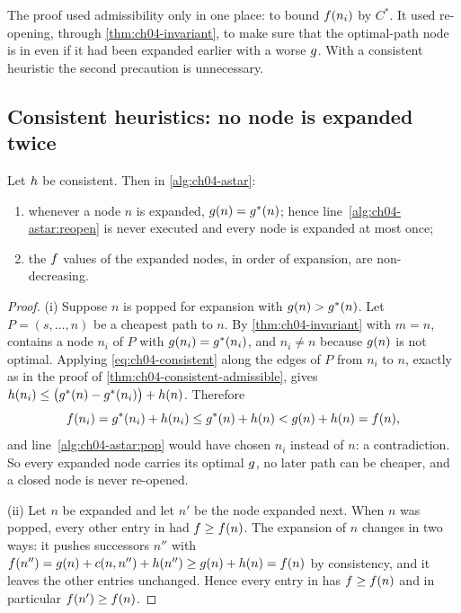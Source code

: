 The proof used admissibility only in one place: to bound $f(n_i)$ by
$C^*$. It used re-opening, through \cref{thm:ch04-invariant}, to make sure
that the optimal-path node is in \Open even if it had been expanded earlier
with a worse $g$. With a consistent heuristic the second precaution is
unnecessary.

\subsection{Consistent heuristics: no node is expanded twice}

\begin{theorem}
\label{thm:ch04-consistent}
Let $h$ be consistent. Then in \cref{alg:ch04-astar}:
\begin{enumerate}[label=(\roman*)]
  \item whenever a node $n$ is expanded, $g(n) = g^*(n)$; hence
        line~\ref{alg:ch04-astar:reopen} is never executed and every node is
        expanded at most once;
  \item the $f$ values of the expanded nodes, in order of expansion, are
        non-decreasing.
\end{enumerate}
\end{theorem}
\begin{proof}
(i) Suppose $n$ is popped for expansion with $g(n) > g^*(n)$. Let
$P = (s, \dots, n)$ be a cheapest path to $n$. By \cref{thm:ch04-invariant}
with $m = n$, \Open contains a node $n_i$ of $P$ with $g(n_i) =
g^*(n_i)$, and $n_i \ne n$ because $g(n)$ is not optimal. Applying
\cref{eq:ch04-consistent} along the edges of $P$ from $n_i$ to $n$, exactly as
in the proof of \cref{thm:ch04-consistent-admissible}, gives $h(n_i) \le
\bigl(g^*(n) - g^*(n_i)\bigr) + h(n)$. Therefore
\[
  f(n_i) = g^*(n_i) + h(n_i) \le g^*(n) + h(n)
             < g(n) + h(n) = f(n),
\]
and line~\ref{alg:ch04-astar:pop} would have chosen $n_i$ instead of $n$: a
contradiction. So every expanded node carries its optimal $g$, no later
path can be cheaper, and a closed node is never re-opened.

(ii) Let $n$ be expanded and let $n'$ be the node expanded next. When $n$ was
popped, every other entry in \Open had $f \ge f(n)$. The expansion of
$n$ changes \Open in two ways: it pushes successors $n''$ with
$f(n'') = g(n) + c(n, n'') + h(n'') \ge g(n) + h(n) =
f(n)$ by consistency, and it leaves the other entries unchanged. Hence
every entry in \Open has $f \ge f(n)$ and in particular
$f(n') \ge f(n)$.
\end{proof}

